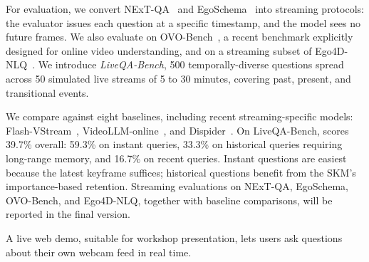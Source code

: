 For evaluation, we convert NExT-QA~\cite{xiao2021nextqa} and EgoSchema~\cite{mangalam2023egoschema} into streaming protocols: the evaluator issues each question at a specific timestamp, and the model sees no future frames. We also evaluate on OVO-Bench~\cite{li2025ovobench}, a recent benchmark explicitly designed for online video understanding, and on a streaming subset of Ego4D-NLQ~\cite{grauman2022ego4d}.
We introduce \emph{LiveQA-Bench}, 500 temporally-diverse questions spread across 50 simulated live streams of 5 to 30 minutes, covering past, present, and transitional events.

We compare against eight baselines, including recent streaming-specific models: Flash-VStream~\cite{zhang2024flashvstream}, VideoLLM-online~\cite{chen2024videollmonline}, and Dispider~\cite{he2024dispider}.
On LiveQA-Bench, \ours scores 39.7\% overall: 59.3\% on instant queries, 33.3\% on historical queries requiring long-range memory, and 16.7\% on recent queries.
Instant questions are easiest because the latest keyframe suffices; historical questions benefit from the SKM's importance-based retention.
Streaming evaluations on NExT-QA, EgoSchema, OVO-Bench, and Ego4D-NLQ, together with baseline comparisons, will be reported in the final version.

A live web demo, suitable for workshop presentation, lets users ask questions about their own webcam feed in real time.
